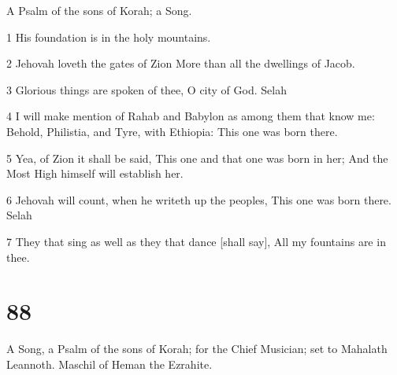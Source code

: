 \par A Psalm of the sons of Korah; a Song.

\par 1 His foundation is in the holy mountains.
\par 2 Jehovah loveth the gates of Zion More than all the dwellings of Jacob.
\par 3 Glorious things are spoken of thee, O city of God. Selah
\par 4 I will make mention of Rahab and Babylon as among them that know me: Behold, Philistia, and Tyre, with Ethiopia: This one was born there.
\par 5 Yea, of Zion it shall be said, This one and that one was born in her; And the Most High himself will establish her.
\par 6 Jehovah will count, when he writeth up the peoples, This one was born there. Selah
\par 7 They that sing as well as they that dance [shall say], All my fountains are in thee.

\chapter{88}

\par A Song, a Psalm of the sons of Korah; for the Chief Musician; set to Mahalath Leannoth. Maschil of Heman the Ezrahite.

